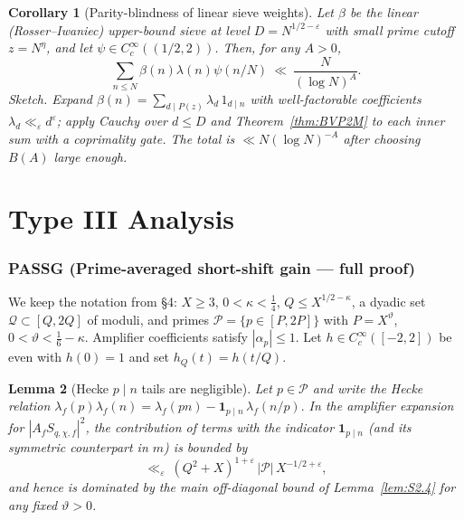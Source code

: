 \documentclass[11pt]{article}
\newtheorem{lemma}{Lemma}[part]
\newtheorem{corollary}[lemma]{Corollary}
\theoremstyle{definition}
\theoremstyle{remark}
\numberwithin{equation}{part}
\begin{document}
\begin{corollary}[Par\-ity-blindness of linear sieve weights]\label{cor:parityblind}
	Let $\beta$ be the linear (Rosser–Iwaniec) upper-bound sieve at level $D=N^{1/2-\varepsilon}$ with small prime cutoff $z=N^{\eta}$, and let $\psi\in C_c^\infty((1/2,2))$. Then, for any $A>0$,
	\[
		\sum_{n\le N}\beta(n)\lambda(n)\psi(n/N)\ \ll\ \frac{N}{(\log N)^A}.
	\]
	\emph{Sketch.} Expand $\beta(n)=\sum_{d\mid P(z)}\lambda_d\,1_{d\mid n}$ with well-factorable coefficients $\lambda_d\ll_\varepsilon d^\varepsilon$; apply Cauchy over $d\le D$ and Theorem~\ref{thm:BVP2M} to each inner sum with a coprimality gate. The total is $\ll N(\log N)^{-A}$ after choosing $B(A)$ large enough.
\end{corollary}


\part{Type III Analysis}

\section{PASSG (Prime-averaged short-shift gain — full proof)}

We keep the notation from §4: $X\ge 3$, $0<\kappa<\tfrac14$, $Q\le X^{1/2-\kappa}$, a dyadic set $\mathcal Q\subset[Q,2Q]$ of moduli, and primes $\mathcal P=\{p\in[P,2P]\}$ with $P=X^\vartheta$, $0<\vartheta<\tfrac16-\kappa$. Amplifier coefficients satisfy $|\alpha_p|\le 1$. Let $h\in C_c^\infty([-2,2])$ be even with $h(0)=1$ and set $h_Q(t)=h(t/Q)$.

\begin{lemma}[Hecke $p\mid n$ tails are negligible]\label{lem:hecke-tails}
	Let $p\in\mathcal P$ and write the Hecke relation
	\(
	\lambda_f(p)\lambda_f(n)=\lambda_f(pn)-\mathbf 1_{p\mid n}\,\lambda_f(n/p).
	\)
	In the amplifier expansion for $|A_f S_{q,\chi,f}|^2$,
	the contribution of terms with the indicator $\mathbf 1_{p\mid n}$ (and its symmetric counterpart in $m$)
	is bounded by
	\[
		\ll_\varepsilon\ (Q^2+X)^{1+\varepsilon}\,|\mathcal P|\,X^{-1/2+\varepsilon},
	\]
	and hence is dominated by the main off-diagonal bound of Lemma~\ref{lem:S2.4} for any fixed $\vartheta>0$.
\end{lemma}
\end{document}
